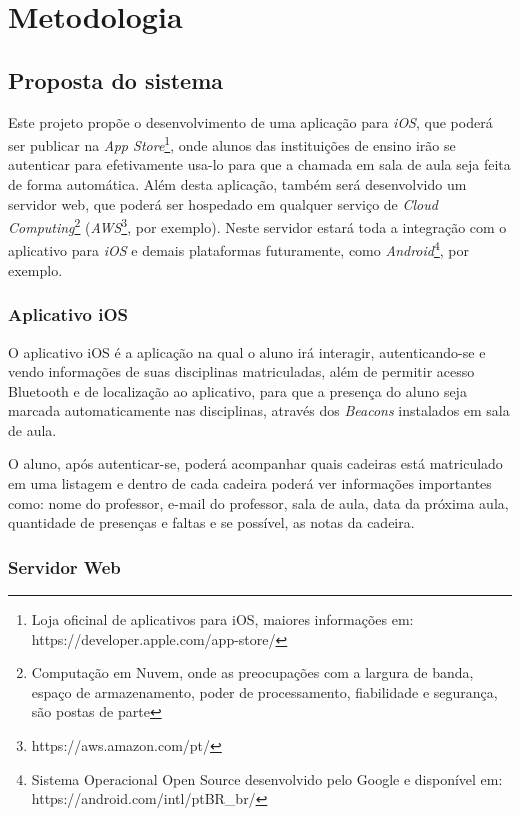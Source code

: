 \documentclass[
	12pt,
	oneside,
	a4paper,
	english,
	brazil,
]{abntex2}
\begin{document}
\chapter{Metodologia}
\section{Proposta do sistema}

Este projeto propõe o desenvolvimento de uma aplicação para \emph{iOS}, que poderá ser publicar na \emph{App Store}\footnote{Loja oficinal de aplicativos para iOS, maiores informações em: https://developer.apple.com/app-store/}, onde alunos das instituições de ensino irão se autenticar para efetivamente usa-lo para que a chamada em sala de aula seja feita de forma automática. Além desta aplicação, também será desenvolvido um servidor web, que poderá ser hospedado em qualquer serviço de \emph{Cloud Computing}\footnote{Computação em Nuvem, onde as preocupações com a largura de banda, espaço de armazenamento, poder de processamento, fiabilidade e segurança, são postas de parte\cite{cloud-computing-about}} (\emph{AWS}\footnote{https://aws.amazon.com/pt/}, por exemplo). Neste servidor estará toda a integração com o aplicativo para \emph{iOS} e demais plataformas futuramente, como \emph{Android}\footnote{Sistema Operacional Open Source desenvolvido pelo Google e disponível em: https://android.com/intl/pt\-BR\_br/}, por exemplo.

\subsection{Aplicativo iOS}

O aplicativo iOS é a aplicação na qual o aluno irá interagir, autenticando-se e vendo informações de suas disciplinas matriculadas, além de permitir acesso Bluetooth e de localização ao aplicativo, para que a presença do aluno seja marcada automaticamente nas disciplinas, através dos \emph{Beacons} instalados em sala de aula.

O aluno, após autenticar-se, poderá acompanhar quais cadeiras está matriculado em uma listagem e dentro de cada cadeira poderá ver informações importantes como: nome do professor, e-mail do professor, sala de aula, data da próxima aula, quantidade de presenças e faltas e se possível, as notas da cadeira.

\subsection{Servidor Web}
\end{document}
